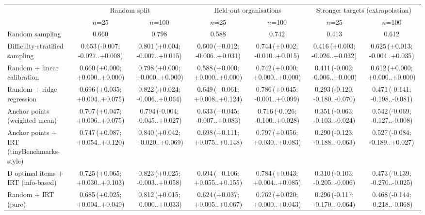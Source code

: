 \begin{tabular}{lcccccc}
\toprule
 & \multicolumn{2}{c}{Random split} & \multicolumn{2}{c}{Held-out organisations} & \multicolumn{2}{c}{Stronger targets (extrapolation)} \\
 & $n$=25 & $n$=100 & $n$=25 & $n$=100 & $n$=25 & $n$=100 \\
\midrule
Random sampling & 0.660 & 0.798 & 0.588 & 0.742 & 0.413 & 0.612 \\
Difficulty-stratified sampling & 0.653\,\scriptsize(-0.007; -0.027..+0.008) & 0.801\,\scriptsize(+0.004; -0.007..+0.015) & 0.600\,\scriptsize(+0.012; -0.006..+0.031) & 0.744\,\scriptsize(+0.002; -0.010..+0.015) & 0.416\,\scriptsize(+0.003; -0.026..+0.032) & 0.625\,\scriptsize(+0.013; -0.004..+0.035) \\
Random + linear calibration & 0.660\,\scriptsize(+0.000; +0.000..+0.000) & 0.798\,\scriptsize(+0.000; +0.000..+0.000) & 0.588\,\scriptsize(+0.000; +0.000..+0.000) & 0.742\,\scriptsize(+0.000; +0.000..+0.000) & 0.411\,\scriptsize(-0.002; -0.006..+0.000) & 0.612\,\scriptsize(+0.000; +0.000..+0.000) \\
Random + ridge regression & 0.696\,\scriptsize(+0.035; +0.004..+0.075) & 0.822\,\scriptsize(+0.024; -0.006..+0.064) & 0.649\,\scriptsize(+0.061; +0.008..+0.124) & 0.786\,\scriptsize(+0.045; -0.001..+0.099) & 0.293\,\scriptsize(-0.120; -0.180..-0.070) & 0.471\,\scriptsize(-0.141; -0.198..-0.081) \\
Anchor points (weighted mean) & 0.707\,\scriptsize(+0.047; +0.006..+0.075) & 0.794\,\scriptsize(-0.004; -0.045..+0.027) & 0.633\,\scriptsize(+0.045; -0.007..+0.083) & 0.716\,\scriptsize(-0.026; -0.100..+0.028) & 0.351\,\scriptsize(-0.063; -0.103..-0.024) & 0.542\,\scriptsize(-0.069; -0.127..-0.008) \\
Anchor points + IRT (tinyBenchmarks-style) & 0.747\,\scriptsize(+0.087; +0.054..+0.120) & 0.840\,\scriptsize(+0.042; +0.020..+0.069) & 0.698\,\scriptsize(+0.111; +0.075..+0.148) & 0.797\,\scriptsize(+0.056; +0.030..+0.083) & 0.290\,\scriptsize(-0.123; -0.188..-0.063) & 0.527\,\scriptsize(-0.084; -0.189..+0.027) \\
D-optimal items + IRT (info-based) & 0.725\,\scriptsize(+0.065; +0.030..+0.103) & 0.823\,\scriptsize(+0.025; -0.003..+0.058) & 0.694\,\scriptsize(+0.106; +0.055..+0.155) & 0.784\,\scriptsize(+0.043; +0.004..+0.085) & 0.310\,\scriptsize(-0.103; -0.205..-0.006) & 0.473\,\scriptsize(-0.139; -0.270..-0.025) \\
Random + IRT (pure) & 0.685\,\scriptsize(+0.025; +0.004..+0.049) & 0.812\,\scriptsize(+0.015; -0.000..+0.033) & 0.624\,\scriptsize(+0.037; +0.005..+0.067) & 0.762\,\scriptsize(+0.020; +0.000..+0.043) & 0.296\,\scriptsize(-0.117; -0.170..-0.064) & 0.468\,\scriptsize(-0.144; -0.218..-0.068) \\

\end{tabular}

